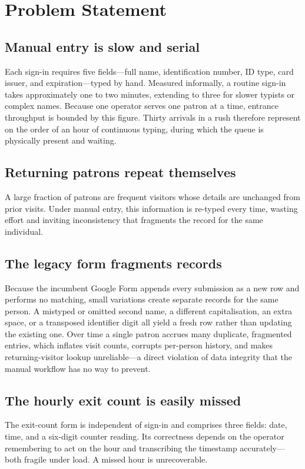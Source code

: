 \documentclass[conference]{IEEEtran}
\begin{document}
\section{Problem Statement}
\subsection{Manual entry is slow and serial}
Each sign-in requires five fields---full name, identification number, ID type, card issuer, and expiration---typed by hand. Measured informally, a routine sign-in takes approximately one to two minutes, extending to three for slower typists or complex names. Because one operator serves one patron at a time, entrance throughput is bounded by this figure. Thirty arrivals in a rush therefore represent on the order of an hour of continuous typing, during which the queue is physically present and waiting.

\subsection{Returning patrons repeat themselves}
A large fraction of patrons are frequent visitors whose details are unchanged from prior visits. Under manual entry, this information is re-typed every time, wasting effort and inviting inconsistency that fragments the record for the same individual.

\subsection{The legacy form fragments records}
Because the incumbent Google Form appends every submission as a new row and performs no matching, small variations create separate records for the same person. A mistyped or omitted second name, a different capitalisation, an extra space, or a transposed identifier digit all yield a fresh row rather than updating the existing one. Over time a single patron accrues many duplicate, fragmented entries, which inflates visit counts, corrupts per-person history, and makes returning-visitor lookup unreliable---a direct violation of data integrity that the manual workflow has no way to prevent.

\subsection{The hourly exit count is easily missed}
The exit-count form is independent of sign-in and comprises three fields: date, time, and a six-digit counter reading. Its correctness depends on the operator remembering to act on the hour and transcribing the timestamp accurately---both fragile under load. A missed hour is unrecoverable.
\end{document}
